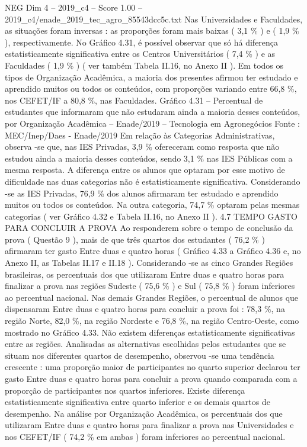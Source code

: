 \begin{textsample}{NEG Dim 4 – 2019\_c4 – Score 1.00 – 2019\_c4/enade\_2019\_tec\_agro\_85543dcc5c.txt}
Nas Universidades e Faculdades, as situações foram inversas : as proporções foram mais baixas ( 3,1 \% ) e ( 1,9 \% ), respectivamente.
No Gráfico 4.31, é possível observar que só há diferença estatisticamente significativa entre os Centros Universitários ( 7,4 \% ) e as Faculdades ( 1,9 \% ) ( ver também Tabela II.16, no Anexo II ).
Em todos os tipos de Organização Acadêmica, a maioria dos presentes afirmou ter estudado e aprendido muitos ou todos os conteúdos, com proporções variando entre 66,8 \%, nos CEFET/IF a 80,8 \%, nas Faculdades.
Gráfico 4.31 – Percentual de estudantes que informaram que não estudaram ainda a maioria desses conteúdos, por Organização Acadêmica – Enade/2019 – Tecnologia em Agronegócios Fonte : MEC/Inep/Daes - Enade/2019 Em relação às Categorias Administrativas, observa -se que, nas IES Privadas, 3,9 \% ofereceram como resposta que não estudou ainda a maioria desses conteúdos, sendo 3,1 \% nas IES Públicas com a mesma resposta.
A diferença entre os alunos que optaram por esse motivo de dificuldade nas duas categorias não é estatisticamente significativa.
Considerando -se as IES Privadas, 76,9 \% dos alunos afirmaram ter estudado e aprendido muitos ou todos os conteúdos.
Na outra categoria, 74,7 \% optaram pelas mesmas categorias ( ver Gráfico 4.32 e Tabela II.16, no Anexo II ). 4.7 TEMPO GASTO PARA CONCLUIR A PROVA Ao responderem sobre o tempo de conclusão da prova ( Questão 9 ), mais de que três quartos dos estudantes ( 76,2 \% ) afirmaram ter gasto Entre duas e quatro horas ( Gráfico 4.33 a Gráfico 4.36 e, no Anexo II, as Tabelas II.17 e II.18 ).
Considerando -se as cinco Grandes Regiões brasileiras, os percentuais dos que utilizaram Entre duas e quatro horas para finalizar a prova nas regiões Sudeste ( 75,6 \% ) e Sul ( 75,8 \% ) foram inferiores ao percentual nacional.
Nas demais Grandes Regiões, o percentual de alunos que dispensaram Entre duas e quatro horas para concluir a prova foi : 78,3 \%, na região Norte, 82,0 \%, na região Nordeste e 76,8 \%, na região Centro-Oeste, como mostrado no Gráfico 4.33.
Não existem diferenças estatisticamente significativas entre as regiões.
Analisadas as alternativas escolhidas pelos estudantes que se situam nos diferentes quartos de desempenho, observou -se uma tendência crescente : uma proporção maior de participantes no quarto superior declarou ter gasto Entre duas e quatro horas para concluir a prova quando comparada com a proporção de participantes nos quartos inferiores.
Existe diferença estatisticamente significativa entre quarto inferior e os demais quartos de desempenho.
Na análise por Organização Acadêmica, os percentuais dos que utilizaram Entre duas e quatro horas para finalizar a prova nas Universidades e nos CEFET/IF ( 74,2 \% em ambas ) foram inferiores ao percentual nacional.

\end{textsample}
